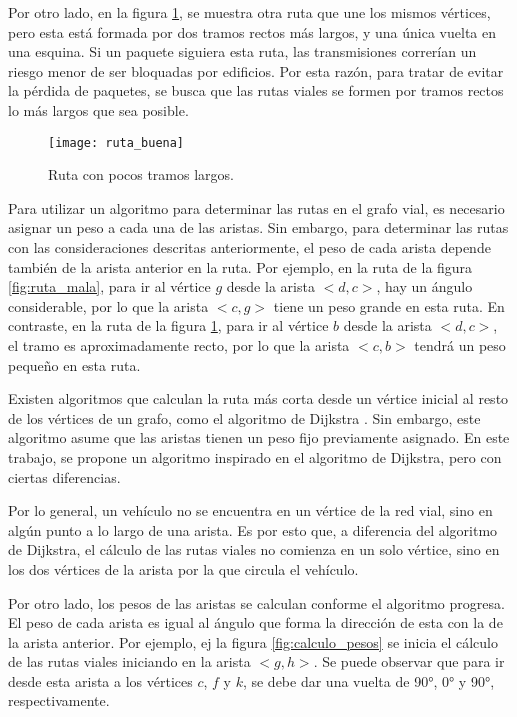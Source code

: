 Por otro lado, en la figura \ref{fig:ruta_buena}, se muestra otra ruta que une
los mismos vértices, pero esta está formada por dos tramos rectos más largos, y
una única vuelta en una esquina. Si un paquete siguiera esta ruta, las
transmisiones correrían un riesgo menor de ser bloquadas por edificios. Por
esta razón, para tratar de evitar la pérdida de paquetes, se busca que las
rutas viales se formen por tramos rectos lo más largos que sea posible.

\begin{figure}[th!]
\centering
\texttt{[image: ruta\_buena]}
\decoRule
\caption[Ruta con pocos tramos largos]{Ruta con pocos tramos largos.}
\label{fig:ruta_buena}
\end{figure}

Para utilizar un algoritmo para determinar las rutas en el grafo vial, es
necesario asignar un peso a cada una de las aristas. Sin embargo, para
determinar las rutas con las consideraciones descritas anteriormente, el peso de
cada arista depende también de la arista anterior en la ruta. Por ejemplo, en la
ruta de la figura \ref{fig:ruta_mala}, para ir al vértice $g$ desde la arista
$<d,c>$, hay un ángulo considerable, por lo que la arista $<c,g>$ tiene un
peso grande en esta ruta. En contraste, en la ruta de la figura
\ref{fig:ruta_buena}, para ir al vértice $b$ desde la arista $<d,c>$, el tramo
es aproximadamente recto, por lo que la arista $<c,b>$ tendrá un peso pequeño
en esta ruta.

Existen algoritmos que calculan la ruta más corta desde un vértice
inicial al resto de los vértices de un grafo, como el algoritmo de Dijkstra
\cite{cormen2001}. Sin embargo, este algoritmo asume que las aristas tienen un
peso fijo previamente asignado. En este trabajo, se propone un algoritmo
inspirado en el algoritmo de Dijkstra, pero con ciertas diferencias.

Por lo general, un vehículo no se encuentra en un vértice de la red vial, sino
en algún punto a lo largo de una arista. Es por esto que, a diferencia del
algoritmo de Dijkstra, el cálculo de las rutas viales no comienza en un solo
vértice, sino en los dos vértices de la arista por la que circula el vehículo.


Por otro lado, los pesos de las aristas se calculan conforme el algoritmo
progresa. El peso de cada arista es igual al ángulo que forma la dirección de
esta con la de la arista anterior. Por ejemplo, ej la figura
\ref{fig:calculo_pesos} se inicia el cálculo de las rutas viales iniciando en
la arista $<g,h>$. Se puede observar que para ir desde esta arista a los
vértices $c$, $f$ y $k$, se debe dar una vuelta de 90\si{\degree},
0\si{\degree} y 90\si{\degree}, respectivamente.

